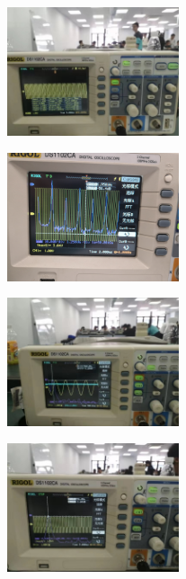 \documentclass{article}
\begin{document}
\begin{figure}\centering
    \includegraphics[width=0.45\textwidth]{4}
\end{figure}

\begin{figure}\centering
    \includegraphics[width=0.45\textwidth]{5}
\end{figure}

\begin{figure}\centering
    \includegraphics[width=0.45\textwidth]{6}
\end{figure}

\begin{figure}\centering
    \includegraphics[width=0.45\textwidth]{7}
\end{figure}
\end{document}
